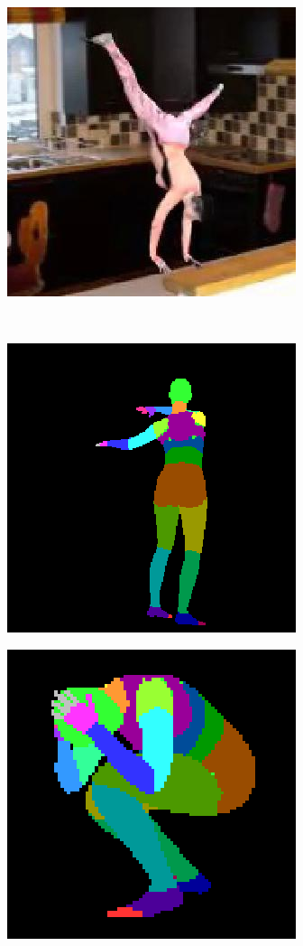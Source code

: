 \documentclass[12pt,a4paper]{article}
\begin{document}
\begin{figure}
\begin{subfigure}{.19\textwidth}
\end{subfigure}
\begin{subfigure}{.19\textwidth}
  \centering
  \includegraphics[scale=0.3]{ung_144_02_c0006_2.jpg}
\end{subfigure}\\
\begin{subfigure}{.2\textwidth}
\centering
  \includegraphics[scale=0.3]{80_15_c0002_segm_85.png}
\end{subfigure}%
\begin{subfigure}{.19\textwidth}
  \centering
  \includegraphics[scale=0.3]{ung_77_09_c0001_segm_67.png}

\end{subfigure}
\end{figure}
\end{document}
